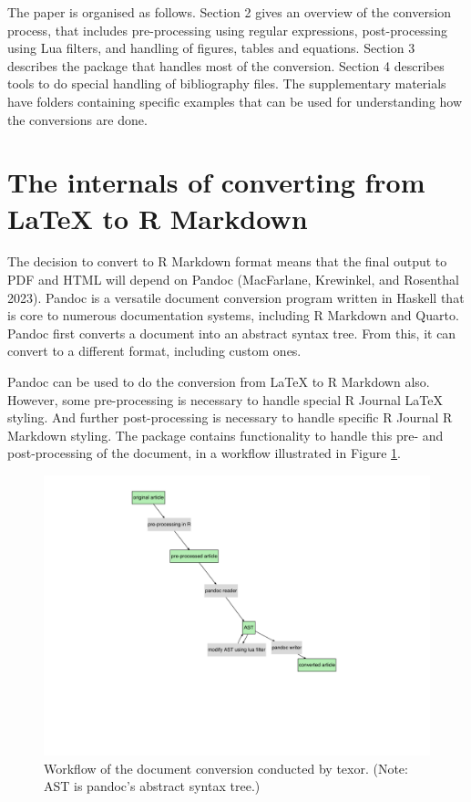 The paper is organised as follows. Section 2 gives an overview of the conversion process, that includes pre-processing using regular expressions, post-processing using Lua filters, and handling of figures, tables and equations. Section 3 describes the  package that handles most of the conversion. Section 4 describes tools to do special handling of bibliography files. The supplementary materials have folders containing specific examples that can be used for understanding how the conversions are done.

\hypertarget{internals}{%
\section{The internals of converting from LaTeX to R Markdown}\label{internals}}

The decision to convert to R Markdown format means that the final output to PDF and HTML will depend on Pandoc (MacFarlane, Krewinkel, and Rosenthal 2023). Pandoc is a versatile document conversion program written in Haskell that is core to numerous documentation systems, including R Markdown and Quarto. Pandoc first converts a document into an abstract syntax tree. From this, it can convert to a different format, including custom ones.

Pandoc can be used to do the conversion from LaTeX to R Markdown also. However, some pre-processing is necessary to handle special R Journal LaTeX styling. And further post-processing is necessary to handle specific R Journal R Markdown styling. The  package contains functionality to handle this pre- and post-processing of the document, in a workflow illustrated in Figure \ref{fig:wf-fig}.

\begin{figure}

{\centering \includegraphics[width=1\linewidth]{figures/wf} 

}

\caption{Workflow of the document conversion conducted by texor. (Note: AST is pandoc's abstract syntax tree.)}\label{fig:wf-fig}
\end{figure}

